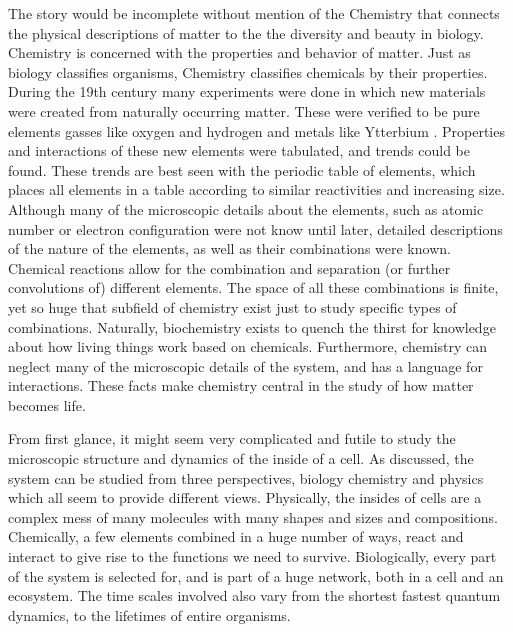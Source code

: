 \documentclass{article}
\begin{document}
The story would be incomplete without mention of the Chemistry that connects the physical descriptions of matter to the the diversity and beauty in biology. Chemistry is concerned with the properties and behavior of matter.
Just as biology classifies organisms, Chemistry classifies chemicals by their properties. During the 19th century many experiments were done in which new materials were created from naturally occurring matter. These were verified to be pure elements gasses like oxygen and hydrogen and metals like Ytterbium . Properties and interactions of these new elements were tabulated, and trends could be found. These trends are best seen with the periodic table of elements, which places all elements in a table according to similar reactivities and increasing size. Although many of the microscopic details about the elements, such as atomic number or electron configuration were not know until later, detailed descriptions of the nature of the elements, as well as their combinations were known. Chemical reactions allow for the combination and separation (or further convolutions of) different elements. The space of all these combinations is finite, yet so huge that subfield of chemistry exist just to study specific types of combinations. Naturally, biochemistry exists to quench the thirst for knowledge about how living things work based on chemicals. Furthermore, chemistry can neglect many of the microscopic details of the system, and has a language for interactions. These facts make chemistry central in the study of how matter becomes life.

From first glance, it might seem very complicated and futile to study the microscopic structure and dynamics of the inside of a cell. As discussed, the system can be studied from three perspectives, biology chemistry and physics which all seem to provide different views. Physically, the insides of cells are a complex mess of many molecules with many shapes and sizes and compositions. Chemically, a few elements combined in a huge number of ways, react and interact to give rise to the functions we need to survive. Biologically, every part of the system is selected for, and is part of a huge network, both in a cell and an ecosystem. The time scales involved also vary from the shortest fastest quantum dynamics, to the lifetimes of entire organisms.
\end{document}
